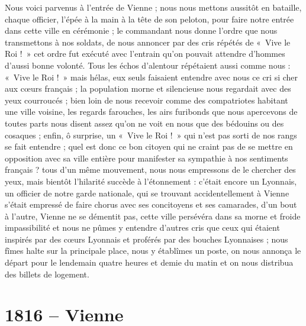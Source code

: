 \documentclass[11pt,a4paper]{report}
\begin{document}
Nous voici parvenus à l'entrée de Vienne ; nous nous mettons aussitôt en bataille, chaque officier, l'épée à la main à la tête de son peloton, pour faire notre entrée dans cette ville en cérémonie ; le commandant nous donne l'ordre que nous transmettons à nos soldats, de nous annoncer par des cris répétés de «~Vive le Roi !~» cet ordre fut exécuté avec l'entrain qu'on pouvait attendre d'hommes d'aussi bonne volonté. Tous les échos d'alentour répétaient aussi comme nous : «~Vive le Roi !~» mais hélas, eux seuls faisaient entendre avec nous ce cri si cher aux cœurs français ; la population morne et silencieuse nous regardait avec des yeux courroucés ; bien loin de nous recevoir comme des compatriotes habitant une ville voisine, les regards farouches, les airs furibonds que nous apercevons de toutes parts nous disent assez qu'on ne voit en nous que des bédouins ou des cosaques ; enfin, ô surprise, un «~Vive le Roi !~» qui n'est pas sorti de nos rangs se fait entendre ; quel est donc ce bon citoyen qui ne craint pas de se mettre en opposition avec sa ville entière pour manifester sa sympathie à nos sentiments français ? tous d'un même mouvement, nous nous empressons de le chercher des yeux, mais bientôt l'hilarité succède à l'étonnement : c'était encore un Lyonnais, un officier de notre garde nationale, qui se trouvant accidentellement à Vienne s'était empressé de faire chorus avec ses concitoyens et ses camarades, d'un bout à l'autre, Vienne ne se démentit pas, cette ville persévéra dans sa morne et froide impassibilité et nous ne pûmes y entendre d'autres cris que ceux qui étaient inspirés par des cœurs Lyonnais et proférés par des bouches Lyonnaises ; nous fîmes halte sur la principale place, nous y établîmes un poste, on nous annonça le départ pour le lendemain quatre heures et demie du matin et on nous distribua des billets de logement.

\section*{1816 -- Vienne}
\end{document}
